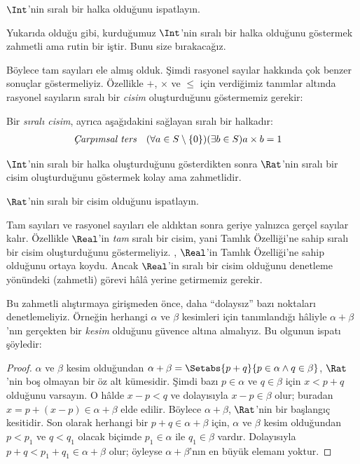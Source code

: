 \begin{prob}
$\Int$'nin sıralı bir halka olduğunu ispatlayın.
\end{prob}

Yukarıda olduğu gibi, kurduğumuz $\Int$'nin sıralı bir halka olduğunu
göstermek zahmetli ama rutin bir iştir. Bunu size bırakacağız.

Böylece tam sayıları ele almış olduk. Şimdi rasyonel sayılar hakkında çok
benzer sonuçlar göstermeliyiz. Özellikle $+$, $\times$ ve $\leq$ için
verdiğimiz tanımlar altında rasyonel sayıların sıralı bir \emph{cisim}
oluşturduğunu göstermemiz gerekir:
\begin{defn}
Bir \emph{sıralı cisim}, ayrıca aşağıdakini sağlayan sıralı bir halkadır:
\begin{align*}
	\emph{Çarpımsal ters}& & (\forall a \in S \setminus \{0\})(\exists b \in S) a\times b& = 1
\end{align*}
\end{defn}

$\Int$'nin sıralı bir halka oluşturduğunu gösterdikten sonra $\Rat$'nin
sıralı bir cisim oluşturduğunu göstermek kolay ama zahmetlidir.

\begin{prob}
$\Rat$'nin sıralı bir cisim olduğunu ispatlayın.
\end{prob}

Tam sayıları ve rasyonel sayıları ele aldıktan sonra geriye yalnızca gerçel
sayılar kalır. Özellikle $\Real$'in \emph{tam} sıralı bir cisim, yani Tamlık
Özelliği'ne sahip sıralı bir cisim oluşturduğunu göstermeliyiz.
, $\Real$'in Tamlık Özelliği'ne sahip olduğunu
ortaya koydu. Ancak $\Real$'in sıralı bir cisim olduğunu denetleme yönündeki
(zahmetli) görevi hâlâ yerine getirmemiz gerekir.

Bu zahmetli alıştırmaya girişmeden önce, daha “dolaysız” bazı noktaları
denetlemeliyiz. Örneğin herhangi $\alpha$ ve $\beta$ kesimleri için
tanımlandığı hâliyle $\alpha + \beta$'nın gerçekten bir \emph{kesim} olduğunu
güvence altına almalıyız. Bu olgunun ispatı şöyledir:

\begin{proof}	
$\alpha$ ve $\beta$ kesim olduğundan
$\alpha + \beta = \Setabs{p + q}{p \in \alpha \land q \in \beta}$,
$\Rat$'nin boş olmayan bir öz alt kümesidir. Şimdi bazı $p \in \alpha$ ve
$q \in \beta$ için $x < p + q$ olduğunu varsayın. O hâlde
$x - p < q$ ve dolayısıyla $x - p \in \beta$ olur; buradan
$x = p + (x - p) \in \alpha + \beta$ elde edilir. Böylece
$\alpha + \beta$, $\Rat$'nin bir başlangıç kesitidir. Son olarak herhangi
bir $p + q \in \alpha + \beta$ için, $\alpha$ ve $\beta$ kesim olduğundan
$p < p_1$ ve $q < q_1$ olacak biçimde $p_1 \in \alpha$ ile
$q_1 \in \beta$ vardır. Dolayısıyla
$p + q < p_1 + q_1 \in \alpha + \beta$ olur; öyleyse
$\alpha + \beta$'nın en büyük elemanı yoktur.
\end{proof}

